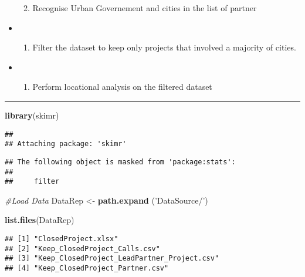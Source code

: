\documentclass[]{article}
\newenvironment{Shaded}{\begin{snugshade}}{\end{snugshade}}
\newcommand{\CommentTok}[1]{\textcolor[rgb]{0.56,0.35,0.01}{\textit{#1}}}
\newcommand{\KeywordTok}[1]{\textcolor[rgb]{0.13,0.29,0.53}{\textbf{#1}}}
\newcommand{\NormalTok}[1]{#1}
\newcommand{\StringTok}[1]{\textcolor[rgb]{0.31,0.60,0.02}{#1}}
\providecommand{\tightlist}{%
  \setlength{\itemsep}{0pt}\setlength{\parskip}{0pt}}
\begin{document}
\begin{itemize}
  \begin{enumerate}
  \def\labelenumi{(\arabic{enumi})}
  \setcounter{enumi}{7}
  \tightlist
  \item
    Recognise Urban Governement and cities in the list of partner
  \end{enumerate}
\item
  \begin{enumerate}
  \def\labelenumi{(\arabic{enumi})}
  \setcounter{enumi}{8}
  \tightlist
  \item
    Filter the dataset to keep only projects that involved a majority of
    cities.
  \end{enumerate}
\item
  \begin{enumerate}
  \def\labelenumi{(\arabic{enumi})}
  \setcounter{enumi}{9}
  \tightlist
  \item
    Perform locational analysis on the filtered dataset
  \end{enumerate}
\end{itemize}

\begin{center}\rule{0.5\linewidth}{\linethickness}\end{center}

\begin{Shaded}
\begin{Highlighting}[]
\KeywordTok{library}\NormalTok{(skimr)}
\end{Highlighting}
\end{Shaded}

\begin{verbatim}
## 
## Attaching package: 'skimr'
\end{verbatim}

\begin{verbatim}
## The following object is masked from 'package:stats':
## 
##     filter
\end{verbatim}

\begin{Shaded}
\begin{Highlighting}[]
\CommentTok{#Load Data}
\NormalTok{DataRep <-}\StringTok{ }\KeywordTok{path.expand}\NormalTok{ (}\StringTok{'DataSource/'}\NormalTok{)}

\KeywordTok{list.files}\NormalTok{(DataRep)}
\end{Highlighting}
\end{Shaded}

\begin{verbatim}
## [1] "ClosedProject.xlsx"                        
## [2] "Keep_ClosedProject_Calls.csv"              
## [3] "Keep_ClosedProject_LeadPartner_Project.csv"
## [4] "Keep_ClosedProject_Partner.csv"
\end{verbatim}
\end{document}
